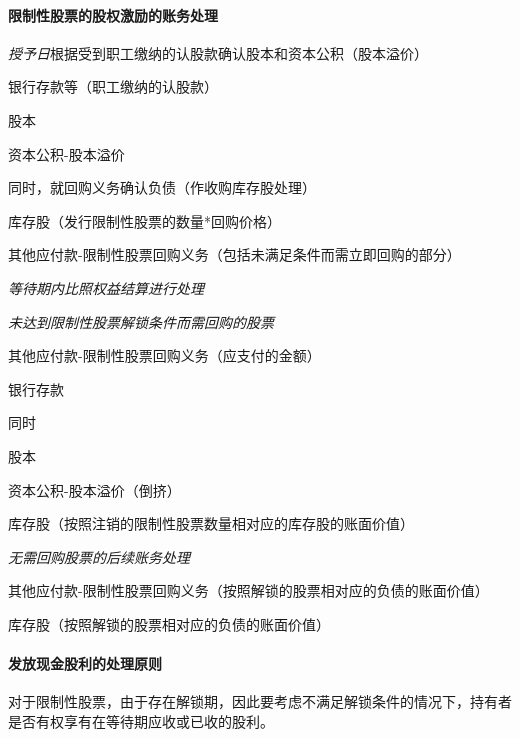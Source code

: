 \documentclass[UTF8,12pt]{ctexart}
\newenvironment{Dr}{%
	\begin{list}{}%
		{
			\setlength{\leftmargin}{2em}
			\setlength{\labelwidth}{2em}
			\setlength{\labelsep}{0pt}
			\setlength{\itemindent}{0pt}
			\setlength{\listparindent}{0pt}
			\setlength{\parsep}{0pt}
			\setlength{\topsep}{0pt}
		}
		\item[\textbf{借：}]
	}{%
	\end{list}
}
\newenvironment{Cr}{%
	\begin{list}{}%
		{
			\setlength{\leftmargin}{3em}
			\setlength{\labelwidth}{2em}
			\setlength{\labelsep}{0pt}
			\setlength{\itemindent}{0pt}
			\setlength{\listparindent}{0pt}
			\setlength{\parsep}{0pt}
			\setlength{\topsep}{0pt}
		}
		\item[\textbf{贷：}]
	}{%
	\end{list}
}
\numberwithin{equation}{section} %
\numberwithin{figure}{section}
\numberwithin{table}{section}
\begin{document}
	\paragraph{限制性股票的股权激励的账务处理}
	
	\textit{授予日}根据受到职工缴纳的认股款确认股本和资本公积（股本溢价）
	
	\begin{Dr}
		银行存款等（职工缴纳的认股款）
	\end{Dr}
	\begin{Cr}
		股本
		
		资本公积-股本溢价
	\end{Cr}
	
	同时，就回购义务确认负债（作收购库存股处理）

	\begin{Dr}
		库存股（发行限制性股票的数量*回购价格）
	\end{Dr}
	\begin{Cr}
		其他应付款-限制性股票回购义务（包括未满足条件而需立即回购的部分）
	\end{Cr}

	\textit{等待期内比照权益结算进行处理}

	\textit{未达到限制性股票解锁条件而需回购的股票}

	\begin{Dr}
		其他应付款-限制性股票回购义务（应支付的金额）
	\end{Dr}
	\begin{Cr}
		银行存款
	\end{Cr}
	
	同时
	
	\begin{Dr}
		股本
		
		资本公积-股本溢价（倒挤）
	\end{Dr}
	\begin{Cr}
		库存股（按照注销的限制性股票数量相对应的库存股的账面价值）
	\end{Cr}

	\textit{无需回购股票的后续账务处理}
	
	\begin{Dr}
		其他应付款-限制性股票回购义务（按照解锁的股票相对应的负债的账面价值）
	\end{Dr}
	\begin{Cr}
		库存股（按照解锁的股票相对应的负债的账面价值）
	\end{Cr}

	\paragraph{发放现金股利的处理原则}
	对于限制性股票，由于存在解锁期，因此要考虑不满足解锁条件的情况下，持有者是否有权享有在等待期应收或已收的股利。
	
\end{document}
